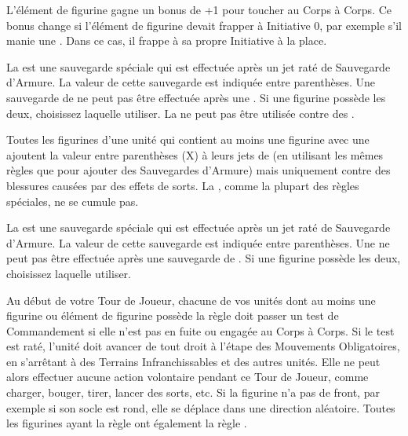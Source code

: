 
L'élément de figurine gagne un bonus de +1 pour toucher au Corps à Corps. Ce bonus change si l'élément de figurine devait frapper à Initiative 0, par exemple s'il manie une \gw{}. Dans ce cas, il frappe à sa propre Initiative à la place.


La \regeneration{} est une sauvegarde spéciale qui est effectuée après un jet raté de Sauvegarde d'Armure. La valeur de cette sauvegarde est indiquée entre parenthèses. Une sauvegarde de \regeneration{} ne peut pas être effectuée après une \wardsave{}. Si une figurine possède les deux, choisissez laquelle utiliser. La \regeneration{} ne peut pas être utilisée contre des \flamingattacks{} .


Toutes les figurines d'une unité qui contient au moins une figurine avec une \magicresistance{} ajoutent la valeur entre parenthèses (X) à leurs jets de \wardsave{} (en utilisant les mêmes règles que pour ajouter des Sauvegardes d'Armure) mais uniquement contre des blessures causées par des effets de sorts. La \magicresistance{}, comme la plupart des règles spéciales, ne se cumule pas.


La \wardsave{} est une sauvegarde spéciale qui est effectuée après un jet raté de Sauvegarde d'Armure. La valeur de cette sauvegarde est indiquée entre parenthèses. Une \wardsave{} ne peut pas être effectuée après une sauvegarde de \regeneration{}. Si une figurine possède les deux, choisissez laquelle utiliser.


Au début de votre Tour de Joueur, chacune de vos unités dont au moins une figurine ou élément de figurine possède la règle \stupidity{} doit passer un test de Commandement si elle n'est pas en fuite ou engagée au Corps à Corps. Si le test est raté, l'unité doit avancer de  tout droit à l'étape des Mouvements Obligatoires, en s'arrêtant à  des Terrains Infranchissables et des autres unités. Elle ne peut alors effectuer aucune action volontaire pendant ce Tour de Joueur, comme charger, bouger, tirer, lancer des sorts, etc. Si la figurine n'a pas de front, par exemple si son socle est rond, elle se déplace dans une direction aléatoire. Toutes les figurines ayant la règle \stupidity{} ont également la règle \immunetopsychology{}.

